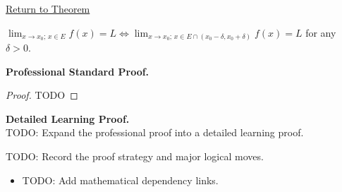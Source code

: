 \newpage
{}
\label{prf:limits-are-local}

\begin{remark*}[Return]
\hyperref[thm:limits-are-local]{Return to Theorem}
\end{remark*}

\begin{theorem*}
$\lim_{x\to x_0;\,x\in E}f(x)=L \iff \lim_{x\to x_0;\,x\in E\cap(x_0-\delta,x_0+\delta)}f(x)=L$ for any $\delta > 0$.
\end{theorem*}

\textbf{Professional Standard Proof.}~\\
\begin{proof}
TODO
\end{proof}

\textbf{Detailed Learning Proof.}~\\
TODO: Expand the professional proof into a detailed learning proof.

\begin{remark*}
TODO: Record the proof strategy and major logical moves.
\end{remark*}

\begin{dependencies}
\begin{itemize}
  \item TODO: Add mathematical dependency links.
\end{itemize}
\end{dependencies}
